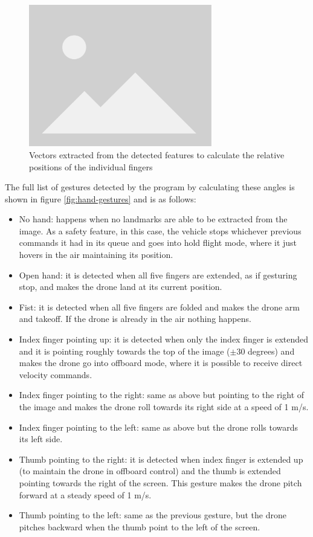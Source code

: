 \begin{figure}
  \centering
  \includegraphics[width=8cm, keepaspectratio]{img/placeholder.png}
  \caption{Vectors extracted from the detected features to calculate the relative positions of the individual fingers}
  \label{fig:vector-calcs}
\end{figure}

The full list of gestures detected by the program by calculating these angles is shown in figure \ref{fig:hand-gestures} and is as follows:
\begin{itemize}
    \item No hand: happens when no landmarks are able to be extracted from the image. As a safety feature, in this case, the vehicle stops whichever previous commands it had in its queue and goes into hold flight mode, where it just hovers in the air maintaining its position.
    \item Open hand: it is detected when all five fingers are extended, as if gesturing stop, and makes the drone land at its current position.
    \item Fist: it is detected when all five fingers are folded and makes the drone arm and takeoff. If the drone is already in the air nothing happens.
    \item Index finger pointing up: it is detected when only the index finger is extended and it is pointing roughly towards the top of the image ($\pm 30$ degrees) and makes the drone go into offboard mode, where it is possible to receive direct velocity commands.
    \item Index finger pointing to the right: same as above but pointing to the right of the image and makes the drone roll towards its right side at a speed of 1 m/s.
    \item Index finger pointing to the left: same as above but the drone rolls towards its left side.
    \item Thumb pointing to the right: it is detected when index finger is extended up (to maintain the drone in offboard control) and the thumb is extended pointing towards the right of the screen. This gesture makes the drone pitch forward at a steady speed of 1 m/s.
    \item Thumb pointing to the left: same as the previous gesture, but the drone pitches backward when the thumb point to the left of the screen.
\end{itemize}

